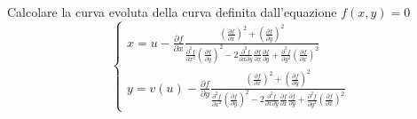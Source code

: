 \documentclass[a4paper]{article}
\begin{document}
\begin{snippetexercise}{
    Calcolare la curva evoluta della curva definita dall'equazione \(f(x,y) = 0\)
}
    \[
        \begin{cases}
            x = u - \frac{\partial f}{\partial x} \frac{\left(\frac{\partial f}{\partial x}\right)^2 + \left(\frac{\partial f}{\partial y}\right)^2}{\frac{\partial^2 f}{\partial x^2} \left(\frac{\partial f}{\partial y}\right)^2 - 2 \frac{\partial^2 f}{\partial x \partial y} \frac{\partial f}{\partial x} \frac{\partial f}{\partial y} + \frac{\partial^2 f}{\partial y^2} \left(\frac{\partial f}{\partial x}\right)^2} \\[15pt]
            y = v(u) - \frac{\partial f}{\partial y} \frac{\left(\frac{\partial f}{\partial x}\right)^2 + \left(\frac{\partial f}{\partial y}\right)^2}{\frac{\partial^2 f}{\partial x^2} \left(\frac{\partial f}{\partial y}\right)^2 - 2 \frac{\partial^2 f}{\partial x \partial y} \frac{\partial f}{\partial x} \frac{\partial f}{\partial y} + \frac{\partial^2 f}{\partial y^2} \left(\frac{\partial f}{\partial x}\right)^2}
        \end{cases}
    \]
\end{snippetexercise}
\end{document}

